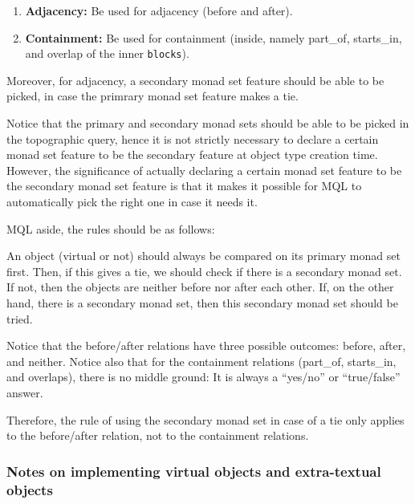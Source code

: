 \documentclass[a4paper,12pt]{article}
\begin{document}
\begin{enumerate}
\item \textbf{Adjacency:} Be used for adjacency (before and after).
\item \textbf{Containment:} Be used for containment (inside, namely
  part\_of, starts\_in, and overlap of the inner \texttt{blocks}).
\end{enumerate}

\noindent Moreover, for adjacency, a secondary monad set feature
should be able to be picked, in case the primrary monad set feature
makes a tie.

Notice that the primary and secondary monad sets should be able to be
picked in the topographic query, hence it is not strictly necessary to
declare a certain monad set feature to be the secondary feature at
object type creation time.  However, the significance of actually
declaring a certain monad set feature to be the secondary monad set
feature is that it makes it possible for MQL to automatically pick the
right one in case it needs it.

MQL aside, the rules should be as follows:

An object (virtual or not) should always be compared on its primary
monad set first.  Then, if this gives a tie, we should check if there
is a secondary monad set.  If not, then the objects are neither before
nor after each other.  If, on the other hand, there is a secondary
monad set, then this secondary monad set should be tried.

Notice that the before/after relations have three possible outcomes:
before, after, and neither.  Notice also that for the containment
relations (part\_of, starts\_in, and overlaps), there is no middle
ground: It is always a ``yes/no'' or ``true/false'' answer.

Therefore, the rule of using the secondary monad set in case of a tie
only applies to the before/after relation, not to the containment
relations.

\subsubsection{Notes on implementing virtual objects and extra-textual objects}
\end{document}
